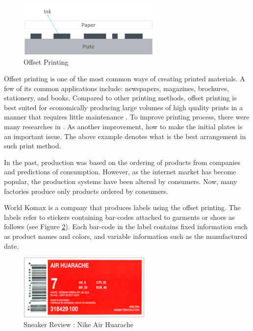 \documentclass[a4paper]{amsart}
\numberwithin{equation}{section} %
\numberwithin{figure}{section} %
\numberwithin{table}{section}
\theoremstyle{plain}
\theoremstyle{definition}
\theoremstyle{plain}
\theoremstyle{plain}
\theoremstyle{plain}
\theoremstyle{plain}
\theoremstyle{plain}
\begin{document}
\begin{figure}[h!]
	\centering
	\includegraphics[width=7cm]{OffsetPrint.pdf}
	\caption{Offset Printing}
	\label{fig:OffsetPrint}
\end{figure}

Offset printing is one of the most common ways of creating printed materials. A few of its common applications include: newspapers, magazines, brochures, stationery, and books. Compared to other printing methods, offset printing is best suited for economically producing large volumes of high quality prints in a manner that requires little maintenance \cite{Kipphan2001}. 
To improve printing process, there were many researches in \cite{AlChan, Muscle, Carmo}.
As another improvement, how to make the initial plates is an important issue. 
The above example denotes what is the best arrangement in such print method.

In the past, production was based on the ordering of products from companies and predictions of consumption. 
However, as the internet market has become popular, the production systems have been altered by consumers. 
Now, many factories produce only products ordered by consumers.

World Komax is a company that produces labels using the offset printing. The labels refer to stickers containing bar-codes attached to garments or shoes as follows (see Figure \ref{fig:AirHuarache}). Each bar-code in the label contains fixed information such as product names and colors, and variable information such as the manufactured date.

\begin{figure}[h!]
	\centering
	\includegraphics[width=6.5cm]{AirHuarache.pdf}
	\caption{Sneaker Review : Nike Air Huarache}
	\label{fig:AirHuarache}       %
\end{figure}
\end{document}
